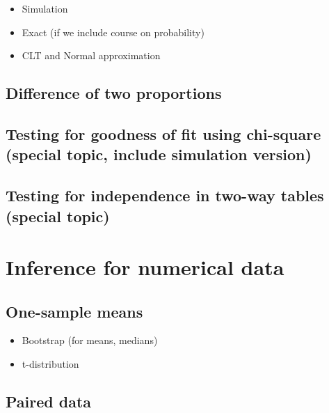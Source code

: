 \documentclass[]{book}
\providecommand{\tightlist}{%
  \setlength{\itemsep}{0pt}\setlength{\parskip}{0pt}}
\begin{document}
\begin{itemize}
\tightlist
\item
  Simulation
\item
  Exact (if we include course on probability)
\item
  CLT and Normal approximation
\end{itemize}

\hypertarget{difference-of-two-proportions}{%
\section{Difference of two proportions}\label{difference-of-two-proportions}}

\hypertarget{testing-for-goodness-of-fit-using-chi-square-special-topic-include-simulation-version}{%
\section{Testing for goodness of fit using chi-square (special topic, include simulation version)}\label{testing-for-goodness-of-fit-using-chi-square-special-topic-include-simulation-version}}

\hypertarget{testing-for-independence-in-two-way-tables-special-topic}{%
\section{Testing for independence in two-way tables (special topic)}\label{testing-for-independence-in-two-way-tables-special-topic}}

\hypertarget{inference-num}{%
\chapter{Inference for numerical data}\label{inference-num}}

\hypertarget{one-sample-means}{%
\section{One-sample means}\label{one-sample-means}}

\begin{itemize}
\tightlist
\item
  Bootstrap (for means, medians)
\item
  t-distribution
\end{itemize}

\hypertarget{paired-data}{%
\section{Paired data}\label{paired-data}}
\end{document}
